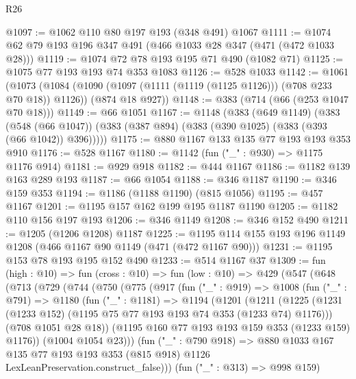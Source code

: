 \begin{lexlean}{R26}
\begin{coremodule}
@1097 := @1062 @110 @80 @197 @193 (@348 @491) @1067
@1111 := @1074 @62 @79 @193 @196 @347 @491 (@466 @1033 @28 @347 (@471 (@472 @1033 @28)))
@1119 := @1074 @72 @78 @193 @195 @71 @490 (@1082 @71)
@1125 := @1075 @77 @193 @193 @74 @353 @1083
@1126 := @528 @1033
@1142 := @1061
    (@1073
      (@1084 (@1090 (@1097 (@1111 (@1119 (@1125 @1126))) (@708 @233 @70 @18)) @1126))
      (@874 @18 @927))
@1148 := @383 (@714 (@66 (@253 @1047 @70 @18)))
@1149 := @66 @1051
@1167 := @1148
    (@383
      (@649 @1149)
      (@383
        (@548 (@66 @1047))
        (@383 (@387 @894) (@383 (@390 @1025) (@383 (@393 (@66 @1042)) @396)))))
@1175 := @880 @1167 @133 @135 @77 @193 @193 @353 @910
@1176 := @528 @1167
@1180 := @1142 (fun ("_" : @930) => @1175 @1176 @914)
@1181 := @929 @918
@1182 := @444 @1167
@1186 := @1182 @139 @163 @289 @193
@1187 := @66 @1054
@1188 := @346 @1187
@1190 := @346 @159 @353
@1194 := @1186 (@1188 @1190) (@815 @1056)
@1195 := @457 @1167
@1201 := @1195 @157 @162 @199 @195 @1187 @1190
@1205 := @1182 @110 @156 @197 @193
@1206 := @346 @1149
@1208 := @346 @152 @490
@1211 := @1205 (@1206 @1208) @1187
@1225 := @1195 @114 @155 @193 @196 @1149 @1208 (@466 @1167 @90 @1149 (@471 (@472 @1167 @90)))
@1231 := @1195 @153 @78 @193 @195 @152 @490
@1233 := @514 @1167 @37
@1309 := fun (high : @10) =>
  fun (cross : @10) =>
  fun (low : @10) =>
  @429
    (@547
      (@648
        (@713
          (@729
            (@744
              (@750
                (@775
                  (@917
                    (fun ("_" : @919) =>
                    @1008
                      (fun ("_" : @791) =>
                      @1180
                        (fun ("_" : @1181) =>
                        @1194
                          (@1201
                            (@1211
                              (@1225
                                (@1231
                                  (@1233 @152)
                                  (@1195 @75 @77 @193 @193 @74 @353 (@1233 @74) @1176)))
                              (@708 @1051 @28 @18))
                            (@1195 @160 @77 @193 @193 @159 @353 (@1233 @159) @1176))
                          (@1004 @1054 @23)))
                      (fun ("_" : @790 @918) =>
                      @880
                        @1033
                        @167
                        @135
                        @77
                        @193
                        @193
                        @353
                        (@815 @918)
                        @1126
                        LexLeanPreservation.construct_false)))
                  (fun ("_" : @313) => @998 @159)

\end{coremodule}
\end{lexlean}
